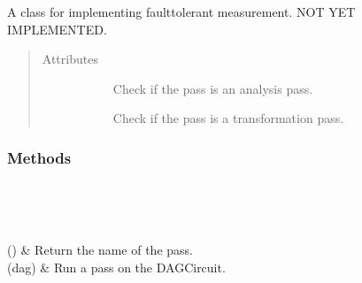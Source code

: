 \documentclass[letterpaper,10pt,english]{sphinxmanual}
\begin{document}
\begin{fulllineitems}
\label{\detokenize{Base:BaseFaultTolerance.BaseFaultTolerantMeasurement}}
A class for implementing fault\sphinxhyphen{}tolerant measurement. NOT YET IMPLEMENTED.
\begin{quote}\begin{description}
\item[{Attributes}] \leavevmode\begin{description}
\item[{}] \leavevmode
Check if the pass is an analysis pass.

\item[{}] \leavevmode
Check if the pass is a transformation pass.

\end{description}

\end{description}\end{quote}
\subsubsection*{Methods}


\begin{savenotes}\sphinxatlongtablestart\begin{longtable}[c]{}
\hline

\endfirsthead

%
{}\\
\hline

\endhead

\hline
{}\\
\endfoot

\endlastfoot

()
&
Return the name of the pass.
\\
\hline
{}(dag)
&
Run a pass on the DAGCircuit.
\\
\hline
\end{longtable}\sphinxatlongtableend\end{savenotes}

\end{fulllineitems}
\end{document}

